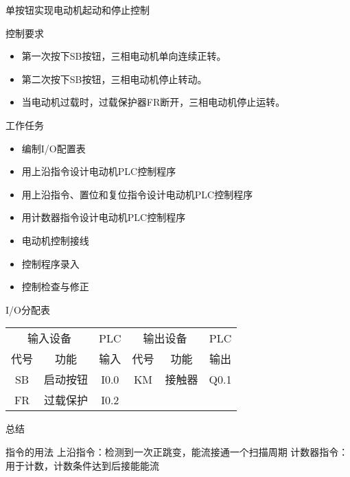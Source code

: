 \begin{frame}[containsverbatim]{单按钮实现电动机起动和停止控制}
\begin{block}{控制要求}
\begin{itemize}
\item 第一次按下SB按钮，三相电动机单向连续正转。
\item 第二次按下SB按钮，三相电动机停止转动。
\item 当电动机过载时，过载保护器FR断开，三相电动机停止运转。
\end{itemize}
\end{block}
\end{frame}
\begin{frame}{}
\begin{block}{工作任务}
\begin{itemize}
\item 编制I/O配置表
\item 用上沿指令设计电动机PLC控制程序
\item 用上沿指令、置位和复位指令设计电动机PLC控制程序
\item 用计数器指令设计电动机PLC控制程序
\item 电动机控制接线
\item 控制程序录入
\item 控制检查与修正
\end{itemize}
\end{block}
\end{frame}
\begin{frame}
\begin{block}{I/O分配表}
\begin{small}
\begin{tabular}{|c|c|c|c|c|c|}
\hline 
\multicolumn{2}{|c|}{输入设备} & PLC &\multicolumn{2}{|c|}{输出设备} & PLC \\ 
\cline{1-2}\cline{4-5}
代号 & 功能 & 输入 & 代号 & 功能 & 输出 \\ 
\hline 
SB & 启动按钮 & I0.0 & KM & 接触器 & Q0.1 \\ 
\hline 
FR & 过载保护 & I0.2 &  &  &  \\ 
\hline
\end{tabular} 
\end{small}
\end{block}
\end{frame}
\begin{frame}{总结}
\begin{block}{指令的用法}
上沿指令：检测到一次正跳变，能流接通一个扫描周期
计数器指令：用于计数，计数条件达到后接能能流
\end{block}
\end{frame}
\endinput
